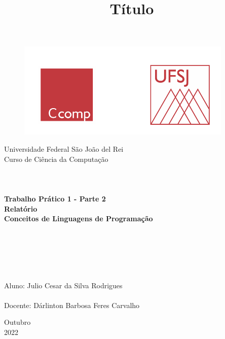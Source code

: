 \documentclass[a4paper, 12pt]{article}
\begin{document}

\begin{titlepage}
	\begin{center}
	
	\begin{figure}[ht]
    \centering
    \includegraphics[width=.44\textwidth]{Images/LogoUFSJ.PNG}
    \label{fig:Capturar.PNG}
    \end{figure}

    	\Huge{Universidade Federal São João del Rei}\\
		\Large{Curso de Ciência da Computação}\\ 

        \vspace{110pt}
        \textbf{\LARGE{
        \\
        \\
        \\
        Trabalho Prático 1 - Parte 2\\
        Relatório\\
        \vspace{0.5cm}
        \Large{Conceitos de Linguagens de Programação}
        \\
        \\
        \\
        }}
        
		\title{{\large{Título}}}
		\vspace{2cm}
	\end{center}
	    
    \begin{flushleft}
		\begin{tabbing}
		\\
		\\
		\\	
		\large{Aluno: Julio Cesar da Silva Rodrigues}\\
	    \\
		\large{Docente: Dárlinton Barbosa Feres Carvalho}\\
	    \end{tabbing}
    \end{flushleft}
	\vspace{0.8cm}
	
	\begin{center}
		\vspace{\fill}
			Outubro\\
		    2022
	\end{center}
\end{titlepage}
\end{document}
